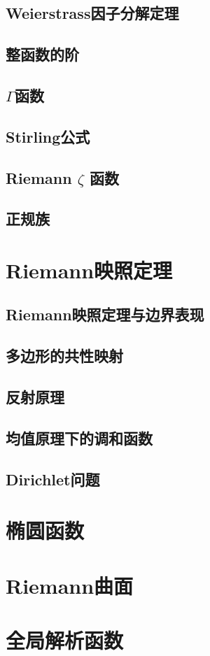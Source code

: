 \documentclass[UTF8]{ctexart}
\begin{document}
\subsection{Weierstrass因子分解定理}
\subsection{整函数的阶}
\subsection{$\Gamma$函数}
\subsection{Stirling公式}
\subsection{Riemann $\zeta$ 函数}
\subsection{正规族}
\section{Riemann映照定理}
\subsection{Riemann映照定理与边界表现}
\subsection{多边形的共性映射}
\subsection{反射原理}
\subsection{均值原理下的调和函数}
\subsection{Dirichlet问题}
\section{椭圆函数}
\section{Riemann曲面}
\section{全局解析函数}
\end{document}
